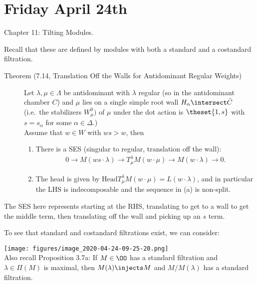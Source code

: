 \hypertarget{friday-april-24th}{%
\section{Friday April 24th}\label{friday-april-24th}}

Chapter 11: Tilting Modules.

Recall that these are defined by modules with both a standard and a
costandard filtration.

\begin{description}
\item[Theorem (7.14, Translation Off the Walls for Antidominant Regular
Weights)]
Let \(\lambda, \mu \in \Lambda\) be antidominant with \(\lambda\)
regular (so in the antidominant chamber \(C\)) and \(\mu\) lies on a
single simple root wall \(H_\alpha \intersect \bar C\) (i.e.~the
stabilizers \(W_\mu^0)\) of \(\mu\) under the dot action is
\(\theset{1, s}\) with \(s = s_\alpha\) for some
\(\alpha \in \Delta\).)\\
Assume that \(w\in W\) with \(ws > w\), then

\begin{enumerate}
\def\labelenumi{\alph{enumi}.}
\tightlist
\item
  There is a SES (singular to regular, translation off the wall):
  \begin{align*} 0 \to M(ws \cdot \lambda ) \to T_{\mu}^\lambda M(w\cdot \mu) \to M(w\cdot \lambda) \to 0.\end{align*}
\item
  The head is given by
  \(\text{Head} T_{\mu}^\lambda M(w\cdot \mu) = L(w\cdot \lambda)\), and
  in particular the LHS is indecomposable and the sequence in (a) is
  non-split.
\end{enumerate}
\end{description}

The SES here represents starting at the RHS, translating to get to a
wall to get the middle term, then translating off the wall and picking
up an \(s\) term.

To see that standard and costandard filtrations exist, we can consider:

\texttt{[image: figures/image\_2020-04-24-09-25-20.png]}\\

Also recall Proposition 3.7a: If \(M\in \OO\) has a standard filtration
and \(\lambda \in \Pi(M)\) is maximal, then \(M(\lambda) \injects M\)
and \(M/M(\lambda)\) has a standard filtration.

